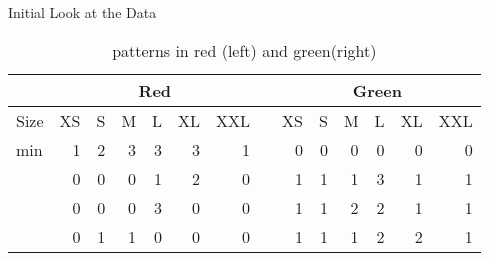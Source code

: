 \begin{frame}{Initial Look at the Data}
\begin{minipage}{\textwidth}
	\begin{table}[htbp]
		\begin{center}
			\begin{tabular}{|l|r|r|r|r|r|r|l|r|r|r|r|r|r|}
				\hline
				\multicolumn{1}{|c|}{} & \multicolumn{6}{c|}{Red} & \multicolumn{1}{|c|}{} &  \multicolumn{6}{c|}{Green}  \\ \hline
				Size & \multicolumn{1}{l|}{XS} & \multicolumn{1}{l|}{S} & \multicolumn{1}{l|}{M} & \multicolumn{1}{l|}{L} & \multicolumn{1}{l|}{XL} & \multicolumn{1}{l|}{XXL}& \multicolumn{1}{|c|}{} & \multicolumn{1}{l|}{XS} & \multicolumn{1}{l|}{S} & \multicolumn{1}{l|}{M} & \multicolumn{1}{l|}{L} & \multicolumn{1}{l|}{XL} & \multicolumn{1}{l|}{XXL} \\ \hline
				min & 1 & 2 & 3 & 3 & 3 & 1 &  & 0 & 0 & 0 & 0 & 0 & 0 \\ \hline
				& 0 & 0 & 0 & 1 & 2 & 0 &  & 1 & 1 & 1 & 3 & 1 & 1 \\ \hline
				& 0 & 0 & 0 & 3 & 0 & 0 &  & 1 & 1 & 2 & 2 & 1 & 1 \\ \hline
				& 0 & 1 & 1 & 0 & 0 & 0 &  & 1 & 1 & 1 & 2 & 2 & 1 \\ \hline
			\end{tabular}
		\end{center}
		\caption{patterns in red (left) and green(right)}
		\label{}
	\end{table}
	
\end{minipage}
\end{frame}
